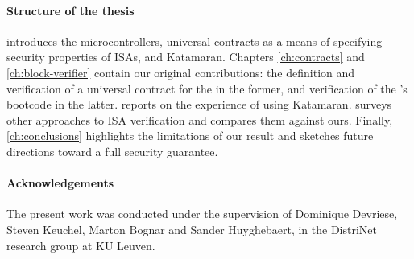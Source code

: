 \paragraph{Structure of the thesis}

 introduces the \msp microcontrollers, universal contracts as a means of specifying security properties of ISAs, and Katamaran. Chapters \ref{ch:contracts} and \ref{ch:block-verifier} contain our original contributions: the definition and verification of a universal contract for the \msp in the former, and verification of the \msp's bootcode in the latter.  reports on the experience of using Katamaran.  surveys other approaches to ISA verification and compares them against ours. Finally, \cref{ch:conclusions} highlights the limitations of our result and sketches future directions toward a full security guarantee.

\paragraph{Acknowledgements}

The present work was conducted under the supervision of \prof Dominique Devriese, \dr Steven Keuchel, \dr Marton Bognar and Sander Huyghebaert, in the DistriNet research group at KU Leuven.
